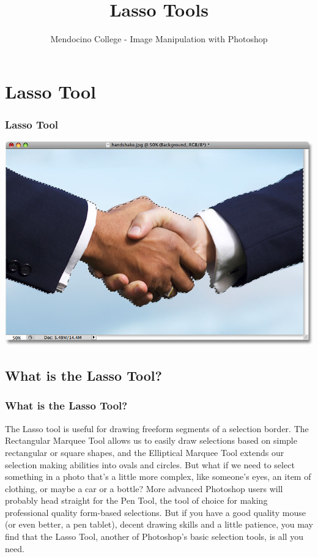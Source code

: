\documentclass{beamer}
\title{Lasso Tools}
\author{Mendocino College - Image Manipulation with Photoshop}
\date{\vspace{-5em}}
\begin{document}
	{
		\begin{frame}
			\vspace{-35pt}
			\maketitle
		\end{frame}
	}


\section{Lasso Tool}
\begin{frame}
	\frametitle{Lasso Tool}
	\begin{center}
		\includegraphics[width = 1.0\textwidth]{images/photoshop-lasso-selection.jpg}
	\end{center}
\end{frame}

\subsection{What is the Lasso Tool?}		
\begin{frame}
	\frametitle{What is the Lasso Tool?}
	\begin{outline}
		\1 The Lasso tool is useful for drawing freeform segments of a selection border.
		\1 The Rectangular Marquee Tool allows us to easily draw selections based on simple rectangular or square shapes, and  the Elliptical Marquee Tool extends our selection making abilities into ovals and circles. 
		\1 But what if we need to select something in a photo that's a little more complex, like someone's eyes, an item of clothing, or maybe a car or a bottle? 		
		\1 More advanced Photoshop users will probably head straight for the Pen Tool, the tool of choice for making professional quality form-based selections. 
		\1 But if you have a good quality mouse (or even better, a pen tablet), decent drawing skills and a little patience, you may find that the Lasso Tool, another of Photoshop's basic selection tools, is all you need.
	\end{outline}
\end{frame}
\end{document}

